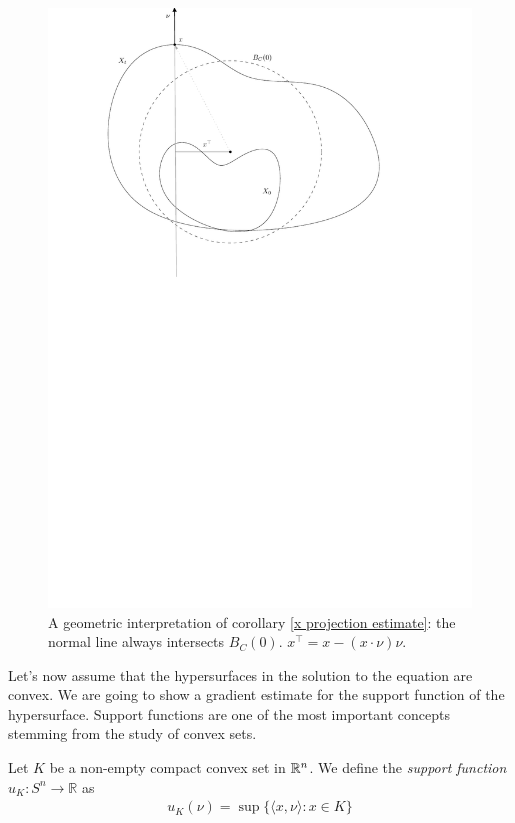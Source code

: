 \begin{figure}
	\centering
	\includegraphics[width=\textwidth]{"figures/10_geometric_idea"}
	\caption{A geometric interpretation of corollary \ref{x projection estimate}: the normal line always intersects $B_C(0)$. $x^\top = x - (x \cdot \nu) \nu$.}
\end{figure}

Let's now assume that the hypersurfaces in the solution to the equation are convex. We are going to show a gradient estimate for the support function of the hypersurface. Support functions are one of the most important concepts stemming from the study of convex sets. 
\begin{defin}
	Let $K$ be a non-empty compact convex set in $\mathbb{R}^n$. We define the {\em support function} $u_K:  S^n \to \mathbb{R} $ as 
	\begin{align*}
		u_K (\nu) = \sup\{\langle x, \nu \rangle : x\in K \}
	\end{align*}
\end{defin}

